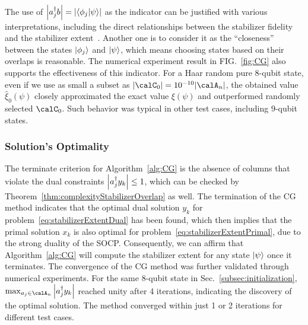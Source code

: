 \documentclass[aps,prx,onecolumn,superscriptaddress,nobibnotes,nofootinbib]{revtex4-2}
\begin{document}
The use of $\abs{a_j^\dagger b} = \abs{\braket{\phi_j}{\psi}}$ as the indicator can be justified with various interpretations, including the direct relationships between the stabilizer fidelity and the stabilizer extent~\cite{heimendahlStabilizerExtentNot2021}\cite[Proposition~2]{Bravyi2019simulationofquantum}.
Another one is to consider it as the ``closeness'' between the states
$\ket{\phi_j}$ and $\ket{\psi}$,
which means choosing states based on their overlaps is reasonable.
The numerical experiment result in FIG.~\ref{fig:CG} also supports the effectiveness of this indicator.
For a Haar random pure 8-qubit state, even if we use as small a subset as $\abs{\calC_0} = 10^{-10} \abs{\calA_n}$, the obtained value $\hat{\xi}_0(\psi)$ closely approximated the exact value $\xi(\psi)$ and outperformed randomly selected $\calC_0$.
Such behavior was typical in other test cases, including $9$-qubit states.

\subsubsection{Solution's Optimality}
\label{subsec:optimality}

The terminate criterion for Algorithm~\ref{alg:CG} is the absence of columns that violate the dual constraints $\abs{a_j^\dagger y_k} \leq 1$, which can be checked by Theorem~\ref{thm:complexityStabilizerOverlap} as well.
The termination of the CG method indicates that the optimal dual solution $y_k$ for problem~\eqref{eq:stabilizerExtentDual}
has been found, which then implies that the primal solution $x_k$ is also optimal for problem~\eqref{eq:stabilizerExtentPrimal},
due to the strong duality of the SOCP.
Consequently, we can affirm that Algorithm~\ref{alg:CG} will compute the stabilizer extent for any state $\ket{\psi}$ once it terminates.
The convergence of the CG method was further validated through numerical experiments.
For the same 8-qubit state in Sec.~\ref{subsec:initialization}, $\max_{a_j \in \calA_n} \abs{a_j^\dagger y_k}$ reached unity after 4 iterations, indicating the discovery of the optimal solution. The method converged within just 1 or 2 iterations for different test cases.
\end{document}
